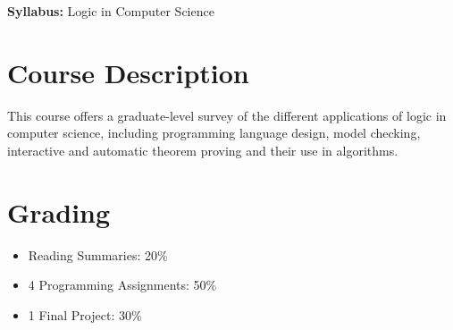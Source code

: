 \documentclass{article}
\begin{document}
\textbf{Syllabus:} Logic in Computer Science

\section*{Course Description}
This course offers a graduate-level survey of the different applications of logic in computer science,
including programming language design, model checking, interactive and automatic theorem proving and their use in algorithms.

\section*{Grading}
\begin{itemize}
\item Reading Summaries: 20\%
\item 4 Programming Assignments: 50\%
\item 1 Final Project: 30\%
\end{itemize}
\end{document}
